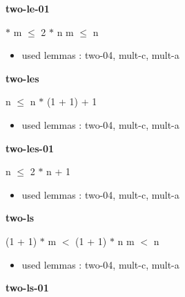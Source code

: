 \documentclass[a4paper]{article}
\begin{document}
\medskip

\bigskip

{\large\bf two-le-01}

\medskip

  $*$ m $\le$ 2 $*$ n \Equiv m $\le$ n

\begin{itemize}


\item       used lemmas  : two-04, mult-c, mult-a

\end{itemize}

\medskip

\bigskip

{\large\bf two-les}

\medskip

 \Fol n $\le$ n $*$ (1 + 1) + 1

\begin{itemize}


\item       used lemmas  : two-04, mult-c, mult-a

\end{itemize}

\medskip

\bigskip

{\large\bf two-les-01}

\medskip

 \Fol n $\le$ 2 $*$ n + 1

\begin{itemize}


\item       used lemmas  : two-04, mult-c, mult-a

\end{itemize}

\medskip

\bigskip

{\large\bf two-ls}

\medskip

 \Fol (1 + 1) $*$ m $<$ (1 + 1) $*$ n \Equiv m $<$ n

\begin{itemize}


\item       used lemmas  : two-04, mult-c, mult-a

\end{itemize}

\medskip

\bigskip

{\large\bf two-ls-01}
\end{document}
